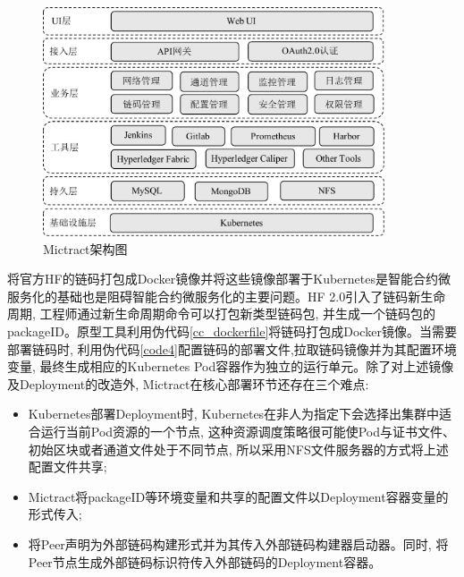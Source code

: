 \begin{figure}[h] %
    \centering %
    \includegraphics[width=0.9\textwidth]{FIGs/chapter4/mictract.pdf} %
    \caption{Mictract架构图} %
    \label{mictract} %
\end{figure}%

将官方HF的链码打包成Docker镜像并将这些镜像部署于Kubernetes是智能合约微服务化的基础也是阻碍智能合约微服务化的主要问题。HF 2.0引入了链码新生命周期, 工程师通过新生命周期命令可以打包新类型链码包, 并生成一个链码包的packageID。原型工具利用伪代码\ref{cc_dockerfile}将链码打包成Docker镜像。当需要部署链码时, 利用伪代码\ref{code4}配置链码的部署文件,拉取链码镜像并为其配置环境变量, 最终生成相应的Kubernetes Pod容器作为独立的运行单元。除了对上述镜像及Deployment的改造外, Mictract在核心部署环节还存在三个难点:

\begin{itemize}[itemindent=2em]
    \item  Kubernetes部署Deployment时, Kubernetes在非人为指定下会选择出集群中适合运行当前Pod资源的一个节点, 这种资源调度策略很可能使Pod与证书文件、初始区块或者通道文件处于不同节点, 所以采用NFS文件服务器的方式将上述配置文件共享;

    \item Mictract将packageID等环境变量和共享的配置文件以Deployment容器变量的形式传入;

    \item 将Peer声明为外部链码构建形式并为其传入外部链码构建器启动器。同时, 将Peer节点生成外部链码标识符传入外部链码的Deployment容器。
\end{itemize}


